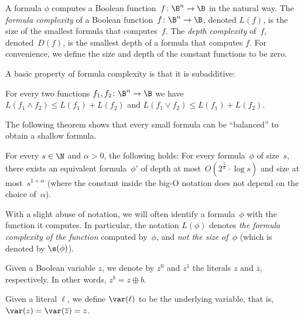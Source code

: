 \begin{definition}
A formula $\phi$ computes a Boolean function~$f\colon\B^{n}\to\B$
in the natural way. The \emph{formula complexity} of a Boolean function~$f\colon\B^{n}\to\B$,
denoted $L(f)$, is the size of the smallest formula that computes~$f$.
The \emph{depth complexity} of~$f$, denoted~$D(f)$, is the smallest
depth of a formula that computes $f$. For convenience, we define
the size and depth of the constant functions to be zero. 
\end{definition}

A basic property of formula complexity is that it is subadditive: 
\begin{fact}
\label{fact:subadditivity}For every two functions $f_{1},f_{2}\colon\B^{n}\to\B$
we have $L(f_{1}\wedge f_{2})\le L(f_{1})+L(f_{2})$ and $L(f_{1}\vee f_{2})\le L(f_{1})+L(f_{2})$. 
\end{fact}

The following theorem shows that every small formula can be ``balanced''
to obtain a shallow formula. 
\begin{theorem}
\label{thm:size-depth-tradeoff}For every $s \in \N$ and $\alpha>0$, the following
holds: For every formula~$\phi$ of size~$s$, there exists an equivalent
formula~$\phi'$ of depth at most~$O(2^{\frac{1}{\alpha}}\cdot\log s)$
and size at most~$s^{1+\alpha}$ (where the constant inside the big-O
notation does not depend on the choice of~$\alpha$).
\end{theorem}

\begin{notation}
With a slight abuse of notation, we will often identify a formula~$\phi$
with the function it computes. In particular, the notation $L(\phi)$
denotes \emph{the formula complexity of the function} computed by~$\phi$,
and \emph{not the size of~$\phi$} (which is denoted by $\s(\phi)$). 
\end{notation}

\begin{notation}
Given a Boolean variable $z$, we denote by $z^{0}$ and $z^{1}$
the literals $z$ and $\overline{z}$, respectively. In other words,
$z^{b}=z\oplus b$. 
\end{notation}

\begin{notation}
Given a literal $\ell$, we define $\var(\ell)$ to be the underlying
variable, that is, $\var(z)=\var(\overline{z})=z$. 
\end{notation}

